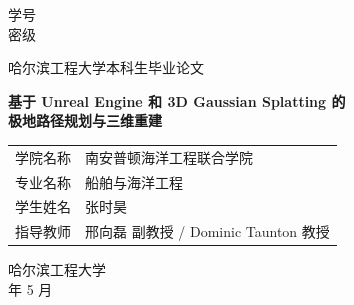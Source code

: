 \begin{titlepage}
\thispagestyle{empty}

\vspace*{0.5cm}

\begin{flushright}
\fontsize{12pt}{18pt}\selectfont
学\hspace{1em}号\hspace{1em}\underline{}\\[0.3cm]
密\hspace{1em}级\hspace{1em}\underline{}
\end{flushright}

\vspace{1.5cm}

\begin{center}

{\fontsize{18pt}{27pt}\selectfont 哈尔滨工程大学本科生毕业论文}

\vspace{2.5cm}

{\fontsize{22pt}{33pt}\selectfont\bfseries
基于 Unreal Engine 和 3D Gaussian Splatting 的\\[0.5cm]
极地路径规划与三维重建}

\vspace{3.5cm}

\fontsize{12pt}{18pt}\selectfont
\begin{tabular}{r@{：}l}
学院名称 & 南安普顿海洋工程联合学院 \\[0.3cm]
专业名称 & 船舶与海洋工程 \\[0.3cm]
学生姓名 & 张时昊 \\[0.3cm]
指导教师 & 邢向磊 副教授 / Dominic Taunton 教授 \\
\end{tabular}

\vspace{2.5cm}

{\fontsize{12pt}{18pt}\selectfont 哈尔滨工程大学}\\[0.3cm]
{\fontsize{12pt}{18pt} 年 5 月}

\end{center}
\end{titlepage}
